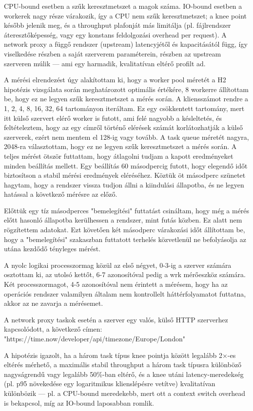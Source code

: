 \documentclass[11pt,a4paper]{article}
\begin{document}
CPU-bound esetben a szűk keresztmetszet a magok száma.
IO-bound esetben a workerek nagy része várakozik, így a CPU nem szűk keresztmetszet; a knee point később jelenik meg, 
és a throughput plafonját más limitálja (pl. fájlrendszer áteresztőképesség, vagy egy konstans feldolgozási overhead per request). 
A network proxy a függő rendszer (upstream) latencyjétől és kapacitásától függ, így viselkedése részben a saját szerverem paraméterein, 
részben az upstream szerveren múlik — ami egy harmadik, kvalitatívan eltérő profilt ad.


A mérési elrendezést úgy alakítottam ki, hogy a worker pool méretét a H2 hipotézis vizsgálata során meghatározott optimális értékére, 
8 workerre állítottam be, hogy ez ne legyen szűk keresztmetszet a mérés során.
A kliensszámot rendre a 1, 2, 4, 8, 16, 32, 64 tartományon iteráltam. Ez egy csökkentett tartomány, mert 
itt külső szervert elérő worker is futott, ami felé nagyobb a késleltetés, és feltételeztem, hogy az egy címről történő elérések
számát korlátozhatják a külső szerverek, ezért nem mentem el 128-ig vagy tovább.
A task queue méretét nagyra, 2048-ra választottam, hogy ez ne legyen szűk keresztmetszet a mérés során.
A teljes mérést ötször futtattam, hogy átlagolni tudjam a kapott eredményeket minden beállítás mellett.
Egy beállítás 60 másodpercig futott, hogy elegendő időt biztosítson a stabil mérési eredmények eléréséhez.
Köztük öt másodperc szünetet hagytam, hogy a rendszer vissza tudjon állni a kiindulási állapotba, és ne legyen hatással a következő mérésre
az előző.

Előttük egy tíz másodperces "bemelegítési" futtatást csináltam, hogy még a mérés előtt hasonló állapotba kerülhessen a rendszer,
mint futás közben. Ez alatt nem rögzítettem adatokat.
Ezt követően két másodperc várakozási időt állítottam be, hogy a "bemelegítési" szakaszban futtatott terhelés közvetlenül ne befolyásolja
az utána kezdődő tényleges mérést.


A nyolc logikai processzormag közül az első négyet, 0-3-ig a szerver számára osztottam ki, az utolsó kettőt, 6-7 azonosítóval 
pedig a wrk mérőeszköz számára. Két processzormagot, 4-5 azonosítóval nem érintett a mérésem, hogy ha az operációs rendszer
valamilyen általam nem kontrollelt háttérfolyamatot futtatna, akkor az ne zavarja a mérésemet.

A network proxy taskok esetén a szerver egy valós, külső HTTP szerverhez kapcsolódott, a következő címen:  "https://time.now/developer/api/timezone/Europe/London"

A hipotézis igazolt, ha a három task típus knee pointja között legalább 2×-es eltérés mérhető,
a maximális stabil throughput a három task típusra különböző nagyságrendű vagy legalább 50\%-ban eltérő, és
a knee utáni latency-meredekség (pl. p95 növekedése egy logaritmikus klienslépésre vetítve) kvalitatívan különbözik — pl. a CPU-bound meredekebb, mert ott a context switch overhead is bekapcsol, míg az IO-bound laposabban romlik.
\end{document}
